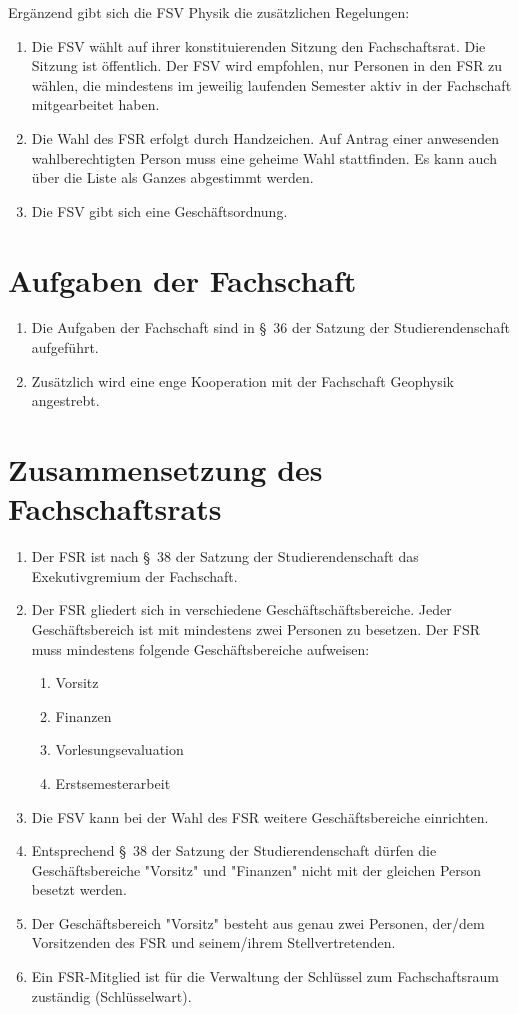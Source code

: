 Ergänzend gibt sich die FSV Physik die zusätzlichen Regelungen:
\begin{enumerate}
	\item Die FSV wählt auf ihrer konstituierenden Sitzung den Fachschaftsrat.
	Die Sitzung ist öffentlich.
	Der FSV wird empfohlen, nur Personen in den FSR zu wählen, die mindestens im jeweilig laufenden Semester aktiv in der Fachschaft mitgearbeitet haben.
	\item Die Wahl des FSR erfolgt durch Handzeichen.
	Auf Antrag einer anwesenden wahlberechtigten Person muss eine geheime Wahl stattfinden.
	Es kann auch über die Liste als Ganzes abgestimmt werden.
	\item Die FSV gibt sich eine Geschäftsordnung.
\end{enumerate}

\section{Aufgaben der Fachschaft}
\begin{enumerate}
	\item Die Aufgaben der Fachschaft sind in §~36 der Satzung der Studierendenschaft aufgeführt.
	\item Zusätzlich wird eine enge Kooperation mit der Fachschaft Geophysik angestrebt.
\end{enumerate}

\section{Zusammensetzung des Fachschaftsrats}
\begin{enumerate}
	\item Der FSR ist nach §~38 der Satzung der Studierendenschaft das Exekutivgremium der Fachschaft.
	\item Der FSR gliedert sich in verschiedene Geschäftschäftsbereiche.
	Jeder Geschäftsbereich ist mit mindestens zwei Personen zu besetzen.
	Der FSR muss mindestens folgende Geschäftsbereiche aufweisen:
	\begin{enumerate}
		\item Vorsitz
		\item Finanzen
		\item Vorlesungsevaluation
		\item Erstsemesterarbeit
	\end{enumerate}
	\item Die FSV kann bei der Wahl des FSR weitere Geschäftsbereiche einrichten.
	\item Entsprechend §~38 der Satzung der Studierendenschaft dürfen die Geschäftsbereiche "Vorsitz" und "Finanzen" nicht mit der gleichen Person besetzt werden.
	\item Der Geschäftsbereich "Vorsitz" besteht aus genau zwei Personen, der/dem Vorsitzenden des FSR und seinem/ihrem Stellvertretenden.
	\item Ein FSR-Mitglied ist für die Verwaltung der Schlüssel zum Fachschaftsraum zuständig (Schlüsselwart).
\end{enumerate}

